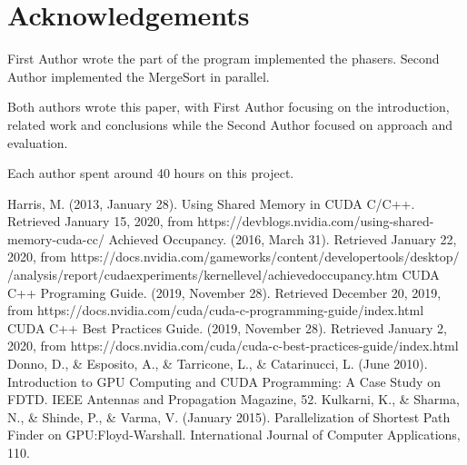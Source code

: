 \documentclass[conference]{IEEEtran}
\begin{document}
\section*{Acknowledgements}

First Author wrote the part of the program implemented the phasers. Second Author implemented the MergeSort in parallel. 

Both authors wrote this paper, with First Author focusing on the introduction, related work and conclusions while the Second Author focused on approach and evaluation.

Each author spent around 40 hours on this project.



\begin{thebibliography}{00}
	 Harris, M. (2013, January 28). Using Shared Memory in CUDA C/C++. Retrieved January 15, 2020, from https://devblogs.nvidia.com/using-shared-memory-cuda-cc/
	 Achieved Occupancy. (2016, March 31). Retrieved January 22, 2020, from https://docs.nvidia.com/gameworks/content/developertools/desktop/
	/analysis/report/cudaexperiments/kernellevel/achievedoccupancy.htm
	 CUDA C++ Programing Guide. (2019, November 28). Retrieved December 20, 2019, from https://docs.nvidia.com/cuda/cuda-c-programming-guide/index.html
	 CUDA C++ Best Practices Guide. (2019, November 28). Retrieved January 2, 2020, from https://docs.nvidia.com/cuda/cuda-c-best-practices-guide/index.html
	 Donno, D., \& Esposito, A., \& Tarricone, L., \& Catarinucci, L. (June 2010). Introduction to GPU Computing and CUDA Programming: A Case Study on FDTD. IEEE Antennas and Propagation Magazine, 52.  
	 Kulkarni, K., \& Sharma, N., \& Shinde, P., \& Varma, V. (January 2015). Parallelization of Shortest Path Finder on GPU:Floyd-Warshall. International Journal of Computer Applications, 110. 
\end{thebibliography}
\end{document}
